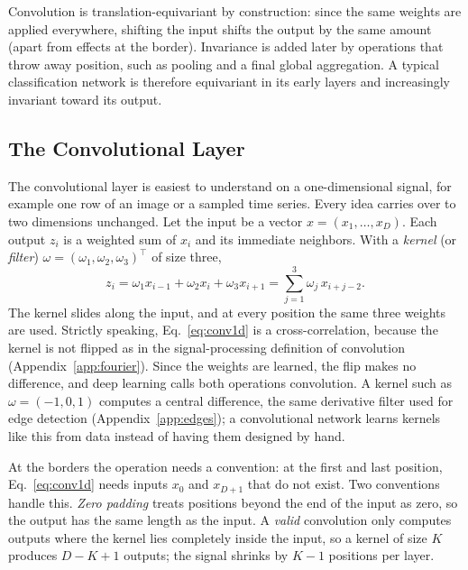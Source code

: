 \noindent
Convolution is translation-equivariant by construction: since the same weights
are applied everywhere, shifting the input shifts the output by the same amount
(apart from effects at the border). Invariance is added later by operations that
throw away position, such as pooling and a final global aggregation. A typical
classification network is therefore equivariant in its early layers and
increasingly invariant toward its output.

\subsection{The Convolutional Layer}

The convolutional layer is easiest to understand on a one-dimensional signal,
for example one row of an image or a sampled time series. Every idea carries
over to two dimensions unchanged. Let the input be a vector $x = (x_1,\dots,x_D)$. Each output $z_i$ is a weighted
sum of $x_i$ and its immediate neighbors. With a \emph{kernel} (or \emph{filter})
$\omega = (\omega_1,\omega_2,\omega_3)^\top$ of size three,
\begin{equation}
  z_i = \omega_1 x_{i-1} + \omega_2 x_i + \omega_3 x_{i+1}
      = \sum_{j=1}^{3} \omega_j\, x_{i+j-2}.
  \label{eq:conv1d}
\end{equation}
\noindent
The kernel slides along the input, and at every position the same three weights
are used. Strictly speaking, Eq.~\eqref{eq:conv1d} is a cross-correlation, because
the kernel is not flipped as in the signal-processing definition of convolution
(Appendix~\ref{app:fourier}). Since the weights are learned, the flip makes no
difference, and deep learning calls both operations convolution. A kernel such
as $\omega = (-1,0,1)$ computes a central difference, the same derivative filter
used for edge detection (Appendix~\ref{app:edges}); a convolutional network
learns kernels like this from data instead of having them designed by hand.

At the borders the operation needs a convention: at the first and last position, Eq.~\eqref{eq:conv1d} needs inputs $x_0$ and
$x_{D+1}$ that do not exist. Two conventions handle this. \emph{Zero padding}
treats positions beyond the end of the input as zero, so the output has the
same length as the input. A \emph{valid} convolution only computes outputs where
the kernel lies completely inside the input, so a kernel of size $K$ produces
$D-K+1$ outputs; the signal shrinks by $K-1$ positions per layer.

